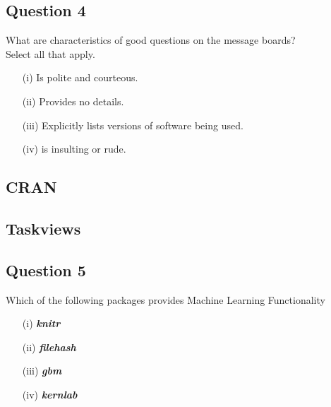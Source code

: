 \documentclass[12pt]{article}
\begin{document}
\newpage
\subsection*{Question 4}

 
What are characteristics of good questions on the message boards? \\ Select all that apply.
 

\begin{itemize}

\item[(i)] Is polite and courteous. 

\item[(ii)] Provides no details. 

\item[(iii)] Explicitly lists versions of software being used. 

\item[(iv)] is insulting or rude. 
\end{itemize}


\newpage
\subsection*{CRAN}

\subsection*{Taskviews}


\newpage
\subsection*{Question 5}

Which of the following packages provides Machine Learning Functionality
\begin{itemize}
\item[(i)] \textbf{\textit{knitr}}
\item[(ii)] \textbf{\textit{filehash}}
\item[(iii)] \textbf{\textit{gbm}}
\item[(iv)] \textbf{\textit{kernlab}}
\end{itemize}

\newpage
\end{document}
